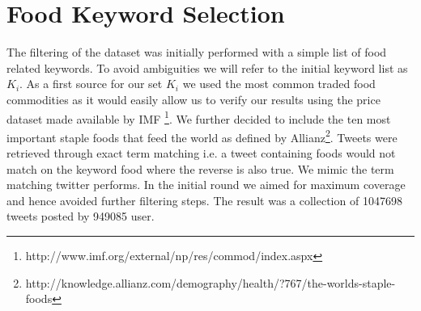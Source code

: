 \documentclass[12pt]{report}
\begin{document}
\section{Food Keyword Selection}

The filtering of the dataset was initially performed with a simple list of food related keywords. To avoid ambiguities we will refer to the initial keyword list as $K_i$. As a first source for our set $K_i$ we used the most common traded food commodities as it would easily allow us to verify our results using the price dataset made available by IMF \footnote{http://www.imf.org/external/np/res/commod/index.aspx}. We further decided to include the ten most important staple foods that feed the world as defined by Allianz\footnote{http://knowledge.allianz.com/demography/health/?767/the-worlds-staple-foods}. Tweets were retrieved through exact term matching i.e. a tweet containing foods would not match on the keyword food where the reverse is also true. We mimic the term matching twitter performs. In the initial round we aimed for maximum coverage and hence avoided further filtering steps. The result was a collection of 1047698 tweets posted by 949085 user. 
\end{document}
